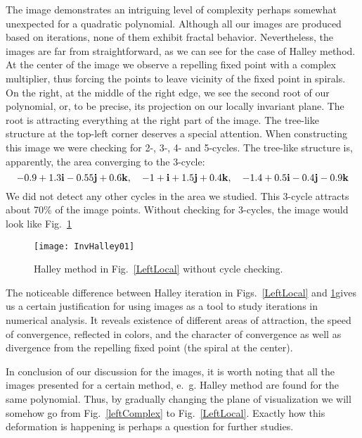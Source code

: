 \documentclass{article}
\theoremstyle{definition}
\begin{document}
The image demonstrates an intriguing level of complexity perhaps somewhat unexpected for a quadratic polynomial. Although all our images are produced based on iterations, none of them exhibit fractal behavior. Nevertheless, the images are far from straightforward, as we can see for the case of Halley method. At the center of the image we observe a repelling fixed point with a complex multiplier, thus forcing the points to leave vicinity of the fixed point in spirals.  On the right, at the middle of the right edge, we see the second root of our polynomial, or, to be precise, its projection on our locally invariant plane. The root is attracting everything at the right part of the image. The tree-like structure at the top-left corner deserves a special attention. When constructing this image we were checking for 2-, 3-, 4- and 5-cycles. The tree-like structure is, apparently, the area converging to the 3-cycle:
\begin{equation}
-0.9+1.3{\bf i} -0.55{\bf j}+0.6{\bf k}, \quad -1+{\bf i}+1.5{\bf j}+0.4{\bf k}, \quad  -1.4+0.5 {\bf i}-0.4{\bf j}-0.9{\bf k}
\end{equation}
We did not detect any other cycles in the area we studied. This 3-cycle attracts about 70\% of the image points. Without checking for 3-cycles, the image would look like Fig.~\ref{HalleyInv01}
\begin{figure}
\begin{center}
\texttt{[image: InvHalley01]}
\caption{Halley method in Fig.~\ref{LeftLocal} without cycle checking.}
\label{HalleyInv01}
\end{center}
\end{figure}

The noticeable difference between Halley iteration in  Figs.~\ref{LeftLocal} and \ref{HalleyInv01}gives us a certain justification for using images as a tool to study iterations in numerical analysis. It reveals existence of different areas of attraction, the speed of convergence, reflected in colors, and the character of convergence as well as divergence from the repelling fixed point (the spiral at the center).

In conclusion of our discussion for the images, it is worth noting that all the images presented for a certain method, e.~g. Halley method are found for the same polynomial. Thus, by gradually changing the plane of visualization we will somehow go from Fig.~\ref{leftComplex}  to Fig.~\ref{LeftLocal}. Exactly how this deformation is happening is perhaps a question for further studies.
\end{document}
